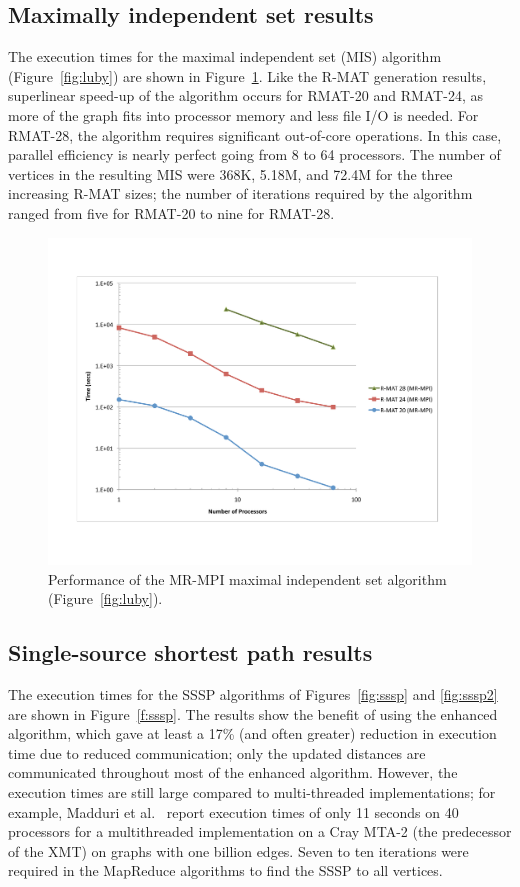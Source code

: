 \subsection{Maximally independent set results}

The execution times for the maximal independent set (MIS) algorithm
(Figure~\ref{fig:luby}) are shown in Figure~\ref{f:luby}.  Like the
R-MAT generation results, superlinear speed-up of the algorithm occurs
for RMAT-20 and RMAT-24, as more of the graph fits into processor
memory and less file I/O is needed.  For RMAT-28, the algorithm
requires significant out-of-core operations. In this case, parallel
efficiency is nearly perfect going from 8 to 64 processors.  The
number of vertices in the resulting MIS were 368K, 5.18M, and 72.4M
for the three
increasing R-MAT sizes; the number of iterations required by the
algorithm ranged from five for RMAT-20 to nine for RMAT-28.

\begin{figure}[htb]
\includegraphics[width=\textwidth]{fig_luby.pdf}
\caption{Performance of the MR-MPI maximal independent set algorithm (Figure~\ref{fig:luby}).}
\label{f:luby}
\end{figure}

\subsection{Single-source shortest path results}

The execution times for the SSSP algorithms of Figures~\ref{fig:sssp}
and \ref{fig:sssp2} are shown in Figure~\ref{f:sssp}.  The results
show the benefit of using the enhanced algorithm, which gave at least
a 17\% (and often greater) reduction in execution time due to reduced
communication; only the updated distances are communicated throughout
most of the enhanced algorithm.  However, the execution times are
still large compared to multi-threaded implementations; for example,
Madduri et al.~\cite{Madduri07} report execution times of only 11
seconds on 40 processors for a multithreaded implementation on a Cray
MTA-2 (the predecessor of the XMT) on graphs with one billion edges.
Seven to ten iterations were required in the MapReduce algorithms to find
the SSSP to all vertices.

